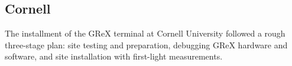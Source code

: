 
\subsection{Cornell}
The installment of the GReX terminal at Cornell University followed a rough three-stage plan: site testing and preparation, debugging GReX hardware and software, and site installation with first-light measurements.

